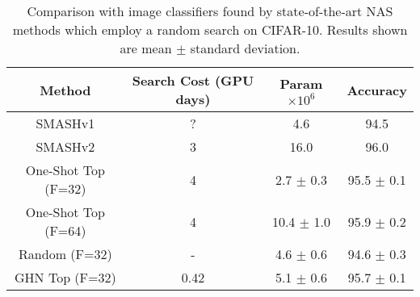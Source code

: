 \begin{table}[t]
\vspace{-0.7cm}
\caption{Comparison with image classifiers found by state-of-the-art NAS methods which employ a random search on CIFAR-10. Results shown are mean $\pm$ standard deviation.}
\label{table:Results1}
\footnotesize
\begin{center}
\begin{tabular}{ c c c c } 
Method & Search Cost (GPU days) & Param $\times 10^6$ & Accuracy   \\ 
\hline
SMASHv1 \citep{brock2017smash} &? & 4.6 & 94.5 \\
SMASHv2 \citep{brock2017smash} & 3 & 16.0 & 96.0\\
One-Shot Top (F=32) \citep{bender2018understanding} & 4  & 2.7 $\pm$ 0.3 & 95.5 $\pm$ 0.1\\
One-Shot Top (F=64) \citep{bender2018understanding} & 4 & 10.4 $\pm$ 1.0 & 95.9 $\pm$ 0.2\\
\hline
\hline
Random (F=32) & - & 4.6 $\pm$ 0.6 & 94.6 $\pm$ 0.3\\ 
GHN Top (F=32) &  0.42  & 5.1 $\pm$ 0.6 & 95.7 $\pm$ 0.1\\ 
\end{tabular}
\end{center}
\end{table}